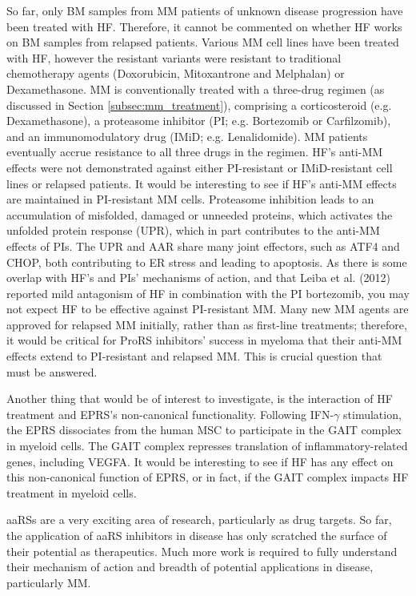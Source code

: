So far, only BM samples from MM patients of unknown disease progression have been treated with HF\@.
Therefore, it cannot be commented on whether HF works on BM samples from relapsed patients.
Various MM cell lines have been treated with HF, however the resistant variants were resistant to traditional chemotherapy agents (Doxorubicin, Mitoxantrone and Melphalan) or Dexamethasone.
MM is conventionally treated with a three-drug regimen (as discussed in Section \ref{subsec:mm_treatment}), comprising a corticosteroid (e.g. Dexamethasone), a proteasome inhibitor (PI; e.g. Bortezomib or Carfilzomib), and an immunomodulatory drug (IMiD; e.g. Lenalidomide).
MM patients eventually accrue resistance to all three drugs in the regimen.
HF's anti-MM effects were not demonstrated against either PI-resistant or IMiD-resistant cell lines or relapsed patients.
It would be interesting to see if HF's anti-MM effects are maintained in PI-resistant MM cells.
Proteasome inhibition leads to an accumulation of misfolded, damaged or unneeded proteins, which activates the unfolded protein response (UPR), which in part contributes to the anti-MM effects of PIs.
The UPR and AAR share many joint effectors, such as ATF4 and CHOP, both contributing to ER stress and leading to apoptosis.
As there is some overlap with HF's and PIs' mechanisms of action, and that Leiba et al. (2012) reported mild antagonism of HF in combination with the PI bortezomib\cite{leiba2012halofuginone}, you may not expect HF to be effective against PI-resistant MM.
Many new MM agents are approved for relapsed MM initially, rather than as first-line treatments;
therefore, it would be critical for ProRS inhibitors' success in myeloma that their anti-MM effects extend to PI-resistant and relapsed MM.
This is crucial question that must be answered.

Another thing that would be of interest to investigate, is the interaction of HF treatment and EPRS's non-canonical functionality.
Following IFN-$\gamma$ stimulation, the EPRS dissociates from the human MSC to participate in the GAIT complex in myeloid cells.
The GAIT complex represses translation of inflammatory-related genes, including VEGFA.
It would be interesting to see if HF has any effect on this non-canonical function of EPRS, or in fact, if the GAIT complex impacts HF treatment in myeloid cells.

aaRSs are a very exciting area of research, particularly as drug targets.
So far, the application of aaRS inhibitors in disease has only scratched the surface of their potential as therapeutics.
Much more work is required to fully understand their mechanism of action and breadth of potential applications in disease, particularly MM\@.
